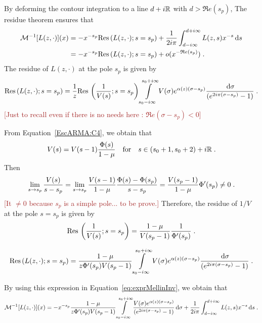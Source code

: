 \documentclass[11pt]{amsart}
\renewcommand{\Re}{\mathfrak{R}e}
\newcommand{\diff}{\,\mathrm{d}}
\newcommand{\ndr}[1]{\textcolor{brown}{[#1]}}
\newcommand{\res}{\mathrm{Res}\,}
\begin{document}
By deforming the contour integration to a line $d+i\mathbb{R}$ with $d > \Re(s_p)$, The residue theorem ensures that
\begin{subequations}
\begin{align}
    \Mcal^{-1}[L(z,\cdot)](x) 
    &= - x^{-s_p}\res(L(z,\cdot);s = s_p) +  \frac{1}{2i\pi} \int_{d-i\infty}^{d+i\infty} L(z,s)x^{-s}\diff s\\
    &= - x^{-s_p}\res(L(z,\cdot);s = s_p) + o(x^{-\Re(s_p)})
    \eqfinp
\end{align}
\label{eq:exprMellinInv}
\end{subequations}
The residue of $L(z,\cdot)$ at the pole $s_p$ is given by 
\begin{equation*}
    \res(L(z,\cdot);s = s_p) 
    = 
    \frac{1}{z}\res\left( \frac{1}{V(s)}; s = s_p\right) \int\limits_{s_0-i\infty}^{s_0+i\infty}
    V(\sigma) e^{ \alpha(z)(\sigma-s_p)}
   \frac{\diff \sigma}{(e^{2i\pi(\sigma-s_p)}-1)}
   \eqfinp
\end{equation*}
\ndr{Just to recall even if there is no needs here : $\Re(\sigma-s_p) < 0$}

From Equation~\eqref{EscARMA:C4}, we obtain that
$$ V(s) = V(s-1)\frac{\Phi(s)}{1-\mu}
        \quad \text{for} \quad
        s \in (s_0+1, s_0+2) + i\mathbb{R}
        \; .$$
Then 
$$ \lim_{s\to s_p} \frac{V(s)}{s-s_p} 
= \lim_{s\to s_p} \frac{V(s-1)}{1-\mu} \frac{\Phi(s)-\Phi(s_p)}{s-s_p}
=  \frac{V(s_p-1)}{1-\mu} \Phi'(s_p) \neq 0 \; .$$
\ndr{It $\neq 0$ because $s_p$ is a simple pole... to be prove.}
Therefore, the  residue of $1/V$ at the pole $s = s_p$ is given by 
$$ \res\left( \frac{1}{V(s)}; s = s_p\right) = \frac{1-\mu}{V(s_p-1)} \frac{1}{\Phi'(s_p)} \eqfinp$$

\begin{equation}
    \res(L(z,\cdot);s = s_p) 
    = 
     \frac{1-\mu}{z \Phi'(s_p) V(s_p-1)}
     \int\limits_{s_0-i\infty}^{s_0+i\infty}
    V(\sigma) e^{ \alpha(z)(\sigma-s_p)}
   \frac{\diff \sigma}{(e^{2i\pi(\sigma-s_p)}-1)}
   \eqfinp
\end{equation}

By using this expression in Equation~\eqref{eq:exprMellinInv}, we obtain that 
\begin{equation*}
    \Mcal^{-1}[L(z,\cdot)](x) 
    = - x^{-s_p}\frac{1-\mu}{z \Phi'(s_p) V(s_p-1)}
     \int\limits_{s_0-i\infty}^{s_0+i\infty}
     \frac{V(\sigma) e^{ \alpha(z)(\sigma-s_p)}
  }{(e^{2i\pi(\sigma-s_p)}-1)}\diff \sigma + \frac{1}{2i\pi} \int_{d-i\infty}^{d+i\infty} L(z,s)x^{-s}\diff s
    \eqfinp
\end{equation*}
\end{document}
